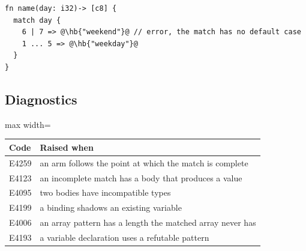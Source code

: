 \begin{lstlisting}[style=coloredverbatimError, escapechar=@]
fn name(day: i32)-> [c8] {
  match day {
    6 | 7 => @\hb{"weekend"}@ // error, the match has no default case
    1 ... 5 => @\hb{"weekday"}@
  }
}
\end{lstlisting}

\subsection{Diagnostics}

\begin{center}
  \begin{adjustbox}{max width=\linewidth}
    \begin{tabular}{|l|l|}
      \hline
      Code & Raised when\\[0pt]
      \hline
      \hline
      E4259 & an arm follows the point at which the match is complete\\[0pt]
      E4123 & an incomplete match has a body that produces a value\\[0pt]
      E4095 & two bodies have incompatible types\\[0pt]
      E4199 & a binding shadows an existing variable\\[0pt]
      E4006 & an array pattern has a length the matched array never has\\[0pt]
      E4193 & a variable declaration uses a refutable pattern\\[0pt]
      \hline
    \end{tabular}
  \end{adjustbox}
\end{center}
